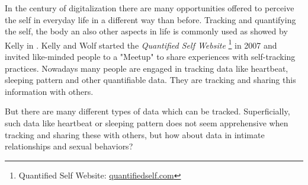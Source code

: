 \label{sec:introduction}

In the century of digitalization there are many opportunities offered to perceive the self in everyday life in a different way than before. Tracking and quantifying the self, the body an also other aspects in life is commonly used as showed by Kelly in \cite{kelly2017inevitable}. Kelly and Wolf started the \textit{Quantified Self Website} \footnote{Quantified Self Website: \url{quantifiedself.com}} in 2007 and invited like-minded people to a "Meetup" to share experiences with self-tracking practices. Nowadays many people are engaged in tracking data like heartbeat, sleeping pattern and other quantifiable data. They are tracking and sharing this information with others. 


But there are many different types of data which can be tracked. Superficially, such data like heartbeat or sleeping pattern does not seem apprehensive when tracking and sharing these with others, but how about data in intimate relationships and sexual behaviors?


